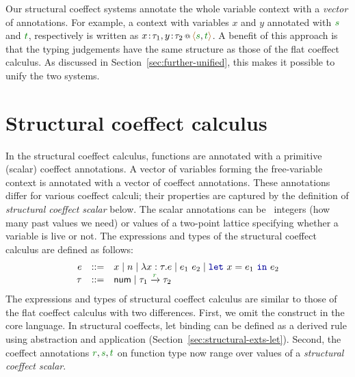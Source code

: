 Our structural coeffect systems annotate the whole variable context with a \emph{vector} of annotations.
For example, a context with variables $x$ and $y$ annotated with $\cclrd{s}$ and $\cclrd{t}$,
respectively is written as $\coctx{x\!:\!\tau_1,y\!:\!\tau_2}{\alift{\cclrd{s},\cclrd{t}}}$.
A benefit of this approach is that the typing judgements have the same structure as those of the
flat coeffect calculus. As discussed in Section~\ref{sec:further-unified}, this makes it possible to unify
the two systems.


%
%

\section{Structural coeffect calculus}
\label{sec:struct-calculus}

In the structural coeffect calculus, functions are annotated with a primitive (scalar) coeffect
annotations. A vector of variables forming the free-variable context is annotated with a vector of
coeffect annotations. These annotations differ for various coeffect calculi; their properties are
captured by the definition of \emph{structural coeffect scalar} below. The scalar annotations can
be \eg~integers (how many past values we need) or values of a two-point lattice specifying whether
a variable is live or not. The expressions and types of the structural coeffect calculus are defined
as follows:
%
\begin{equation*}
\begin{array}{rcl}
e &::=& x \sep n \sep \lambda x:\tau.e \sep e_1~e_2 \sep \kvd{let}~x = e_1~\kvd{in}~e_2\\
\tau &::=& \ident{num} \sep \tau_1 \xrightarrow{\cclrd{r}} \tau_2
\end{array}
\end{equation*}
%
The expressions and types of structural coeffect calculus are similar to those of the flat coeffect
calculus with two differences. First, we omit the  construct in the core language. In
structural coeffects, let binding can be defined as a derived rule using abstraction and application
(Section~\ref{sec:structural-exts-let}). Second, the coeffect annotations $\cclrd{r}, \cclrd{s}, \cclrd{t}$
on function type now range over values of a \emph{structural coeffect scalar}.

